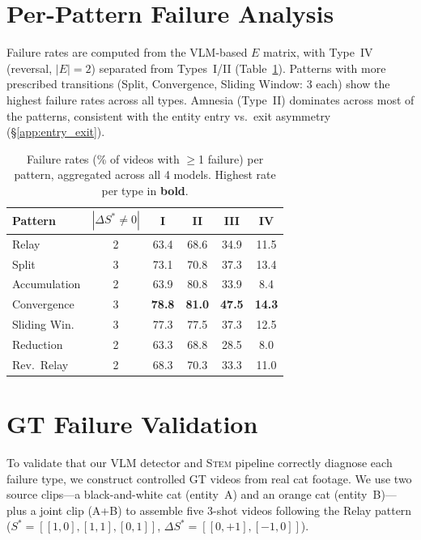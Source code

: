 \documentclass[sigconf,review,anonymous]{acmart}
\newcommand{\stem}{\textsc{Stem}}
\begin{document}
\section{Per-Pattern Failure Analysis}
\label{app:failure_pattern}

Failure rates are computed from the VLM-based $E$ matrix, with Type~IV (reversal, $|E|=2$) separated from Types~I/II (Table~\ref{tab:failure_rates}). Patterns with more prescribed transitions (Split, Convergence, Sliding Window: 3 each) show the highest failure rates across all types.
Amnesia (Type~II) dominates across most of the patterns, consistent with the entity entry vs.\ exit asymmetry (\S\ref{app:entry_exit}).


\begin{table}[H]
\caption{Failure rates (\% of videos with $\geq$1 failure) per pattern, aggregated across all 4 models. Highest rate per type in \textbf{bold}.}
\label{tab:failure_rates}
\centering
\small
\setlength{\tabcolsep}{3pt}
\begin{tabular}{@{}lccccc@{}}
\toprule
Pattern & $|\Delta S^* \neq 0|$ & I & II & III & IV \\
\midrule
Relay         & 2 & 63.4 & 68.6 & 34.9 & 11.5 \\
Split         & 3 & 73.1 & 70.8 & 37.3 & 13.4 \\
Accumulation  & 2 & 63.9 & 80.8 & 33.9 & 8.4 \\
Convergence   & 3 & \textbf{78.8} &         
\textbf{81.0} & \textbf{47.5} & \textbf{14.3} \\
Sliding Win.  & 3 & 77.3 & 77.5 & 37.3 & 12.5 \\
Reduction     & 2 & 63.3 & 68.8 & 28.5 & 8.0 \\
Rev.\ Relay   & 2 & 68.3 & 70.3 & 33.3 & 11.0 \\
\bottomrule
\end{tabular}
\end{table}



\section{GT Failure Validation}
\label{app:gt_failures}

To validate that our VLM detector and \stem{} pipeline correctly diagnose each failure type, we construct controlled GT videos from real cat footage.
We use two source clips---a black-and-white cat (entity~A) and an orange cat (entity~B)---plus a joint clip (A+B) to assemble five 3-shot videos following the Relay pattern ($S^* = [[1,0],[1,1],[0,1]]$, $\Delta S^* = [[0,{+}1],[{-}1,0]]$).
\end{document}
